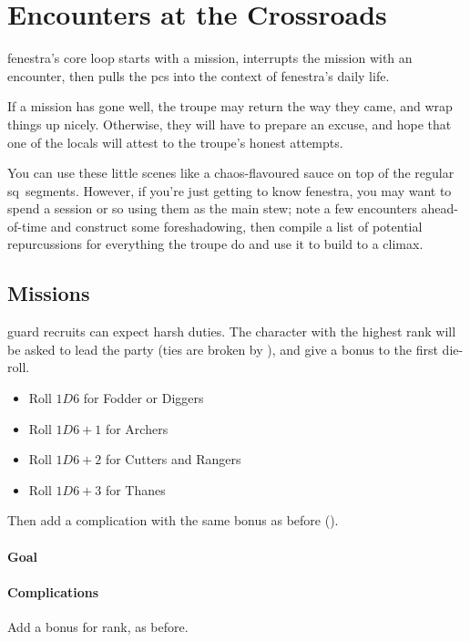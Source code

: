 \chapter{Encounters at the Crossroads}
\label{encounters}

\Gls{fenestra}'s core loop starts with a mission, interrupts the mission with an encounter, then pulls the \glspl{pc} into the context of \gls{fenestra}'s daily life.

If a mission has gone well, the troupe may return the way they came, and wrap things up nicely.
Otherwise, they will have to prepare an excuse, and hope that one of the locals will attest to the troupe's honest attempts.

You can use these little scenes like a chaos-flavoured sauce on top of the regular \gls{sq}~\glspl{segment}.
However, if you're just getting to know \gls{fenestra}, you may want to spend a session or so using them as the main stew; note a few encounters ahead-of-time and construct some foreshadowing, then compile a list of potential repurcussions for everything the troupe do and use it to build to a climax.

\section{Missions}
\label{NGmissions}

\begin{multicols}{2}

\noindent
\Gls{guard} recruits can expect harsh duties.
The character with the highest rank will be asked to lead the party (ties are broken by ), and give a bonus to the first die-roll.

\begin{itemize}
  \item
  Roll $1D6$ for Fodder or Diggers
  \item
  Roll $1D6+1$ for Archers
  \item
  Roll $1D6+2$ for Cutters and Rangers
  \item
  Roll $1D6+3$ for Thanes
\end{itemize}

Then add a complication with the same bonus as before ().

\subsubsection{Goal}

\ngMissions

\subsubsection{Complications}

Add a bonus for rank, as before.

\missionComplications

\end{multicols}

